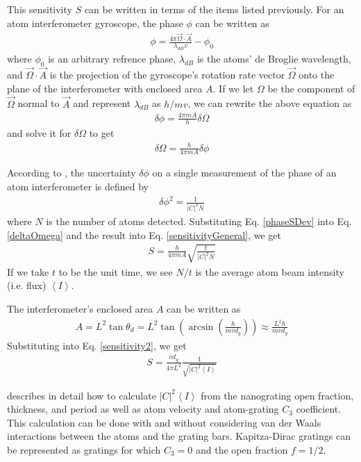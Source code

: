 \documentclass[twocolumn,pra,showpacs,superscriptaddress,longbibliography]{revtex4-1}   %
\newcommand{\avg}[1]{\left\langle #1 \right\rangle}
\begin{document}
This sensitivity $S$ can be written in terms of the items listed previously.
For an atom interferometer gyroscope, the phase $\phi$ can be written as
\begin{align}
	\phi = \frac{4\pi\vec{\Omega}\cdot\vec{A}}{\lambda_{dB} v} - \phi_0
\end{align}
where $\phi_0$ is an arbitrary refrence phase, $\lambda_{dB}$ is the atoms' de Broglie wavelength, and $\vec{\Omega}\cdot\vec{A}$ is the projection of the gyroscope's rotation rate vector $\vec{\Omega}$ onto the plane of the interferometer with enclosed area $A$. If we let $\Omega$ be the component of $\vec{\Omega}$ normal to $\vec{A}$ and represent $\lambda_{dB}$ as $h/mv$, we can rewrite the above equation as
\begin{align}
	\delta\phi = \frac{4\pi m A}{h}\delta\Omega
\end{align}
and solve it for $\delta\Omega$ to get
\begin{align}
	\delta\Omega = \frac{h}{4\pi m A}\delta\phi
	\label{deltaOmega}
\end{align}

According to \cite{Lenef1997}, the uncertainty $\delta\phi$ on a single measurement of the phase of an atom interferometer is defined by
\begin{align}
	\delta\phi^2 = \frac{1}{|C|^2N}
	\label{phaseSDev}
\end{align}
where $N$ is the number of atoms detected.
Substituting Eq. \ref{phaseSDev} into Eq. \ref{deltaOmega} and the result into Eq. \ref{sensitivityGeneral}, we get 
\begin{align}
	S = \frac{h}{4\pi m A} \sqrt{\frac{t}{|C|^2N}}
	\label{sensitivity2}
\end{align}
If we take $t$ to be the unit time, we see $N/t$ is the average atom beam intensity (i.e. flux) $\avg{I}$.

The interferometer's enclosed area $A$ can be written as
\begin{align}
	A = L^2\tan{\theta_d} = L^2\tan\left(\arcsin\left(\frac{h}{mvd_g}\right)\right) \approx \frac{L^2h}{mvd_g}
\end{align}
Substituting into Eq. \ref{sensitivity2}, we get
\begin{align}
	S = \frac{vd_g}{4\pi L^2} \frac{1}{ \sqrt{|C|^2\avg{I}}}
	\label{sensitivity3}
\end{align}


\cite{Cronin2005} describes in detail how to calculate $|C|^2\avg{I}$ from the nanograting open fraction, thickness, and period as well as atom velocity and atom-grating $C_3$ coefficient. This calculation can be done with and without considering van der Waals interactions between the atoms and the grating bars. 
Kapitza-Dirac gratings can be represented as gratings for which $C_3 = 0$ and the open fraction $f = 1/2$.
\end{document}

